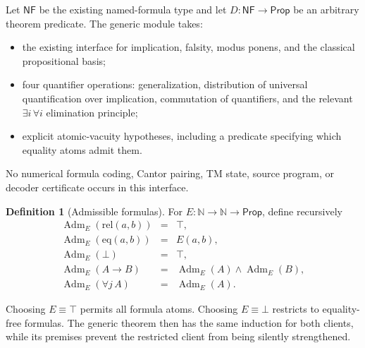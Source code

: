 \documentclass[11pt,letterpaper]{article}
\newcommand{\code}[1]{\texttt{\small\detokenize{#1}}}
\theoremstyle{definition}\newtheorem{definition}[theorem]{Definition}
\begin{document}
Let \(\mathsf{NF}\) be the existing named-formula type and let
\(D:\mathsf{NF}\to\mathsf{Prop}\) be an arbitrary theorem predicate.
The generic module takes:
\begin{itemize}
\item the existing \code{Kalmar.Classical} interface for implication, falsity,
modus ponens, and the classical propositional basis;
\item four quantifier operations: generalization, distribution of universal
quantification over implication, commutation of quantifiers, and the relevant
\(\exists i\,\forall i\) elimination principle;
\item explicit atomic-vacuity hypotheses, including a predicate specifying
which equality atoms admit them.
\end{itemize}

No numerical formula coding, Cantor pairing, TM state, source program, or
decoder certificate occurs in this interface.

\begin{definition}[Admissible formulas]
For \(E:\mathbb N\to\mathbb N\to\mathsf{Prop}\), define recursively
\[
\begin{array}{rcl}
 \operatorname{Adm}_E(\mathrm{rel}(a,b))&=&\top,\\
 \operatorname{Adm}_E(\mathrm{eq}(a,b))&=&E(a,b),\\
 \operatorname{Adm}_E(\bot)&=&\top,\\
 \operatorname{Adm}_E(A\to B)&=&\operatorname{Adm}_E(A)\land\operatorname{Adm}_E(B),\\
 \operatorname{Adm}_E(\forall j\,A)&=&\operatorname{Adm}_E(A).
\end{array}
\]
\end{definition}

Choosing \(E\equiv\top\) permits all formula atoms. Choosing
\(E\equiv\bot\) restricts to equality-free formulas. The generic theorem
then has the same induction for both clients, while its premises prevent the
restricted client from being silently strengthened.
\end{document}
